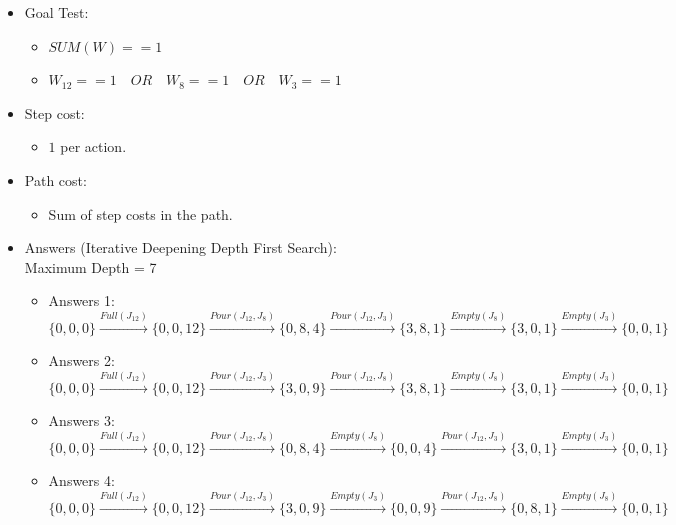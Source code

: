 \documentclass[12pt, a4paper]{article}
\begin{document}
\begin{enumerate}
\begin{itemize}
\begin{itemize}
		\end{itemize}
	
		\item Goal Test:
		\begin{itemize}
			\item $SUM(W) == 1$
			\item $W_{12} == 1 \quad OR\quad W_{8} == 1 \quad OR\quad W_{3} == 1 $
		\end{itemize}
		\item Step cost:
		\begin{itemize}
			\item $1$ per action.
		\newpage
		\end{itemize}
		\item Path cost:
		\begin{itemize}
			\item Sum of step costs in the path.
		\end{itemize}
		\item Answers (Iterative Deepening Depth First Search):\\
		Maximum Depth = 7
		\begin{itemize}
			\item Answers 1:\\
			$\{0, 0, 0\} \xrightarrow{Full(J_{12})} \{0, 0, 12\} \xrightarrow{Pour(J_{12}, J_{8})} \{0,8,4\} \xrightarrow{Pour(J_{12}, J_{3})} \{3,8,1\} \xrightarrow{Empty(J_{8})} \{3,0,1\} \xrightarrow{Empty(J_{3})} \{0,0,1\}$\\ 
			
			\item Answers 2:\\
			$\{0, 0, 0\} \xrightarrow{Full(J_{12})} \{0, 0, 12\} \xrightarrow{Pour(J_{12}, J_{3})} \{3,0,9\}
			\xrightarrow{Pour(J_{12}, J_{8})} \{3,8,1\} \xrightarrow{Empty(J_{8})} \{3,0,1\} \xrightarrow{Empty(J_{3})} \{0,0,1\}$\\
			
			\item Answers 3:\\
			$\{0, 0, 0\} \xrightarrow{Full(J_{12})} \{0, 0, 12\} \xrightarrow{Pour(J_{12}, J_{8})} \{0,8,4\}
			\xrightarrow{Empty(J_{8})} \{0,0,4\} \xrightarrow{Pour(J_{12}, J_{3})} \{3,0,1\} \xrightarrow{Empty(J_{3})} \{0,0,1\}$\\
			
			\item Answers 4:\\
			$\{0, 0, 0\} \xrightarrow{Full(J_{12})} \{0, 0, 12\} \xrightarrow{Pour(J_{12}, J_{3})} \{3,0,9\} \xrightarrow{Empty(J_{3})} \{0,0,9\} \xrightarrow{Pour(J_{12}, J_{8})} \{0,8,1\} \xrightarrow{Empty(J_{8})} \{0,0,1\}$\\
		\end{itemize}
		\end{itemize}
	

\end{enumerate}
\end{document}
